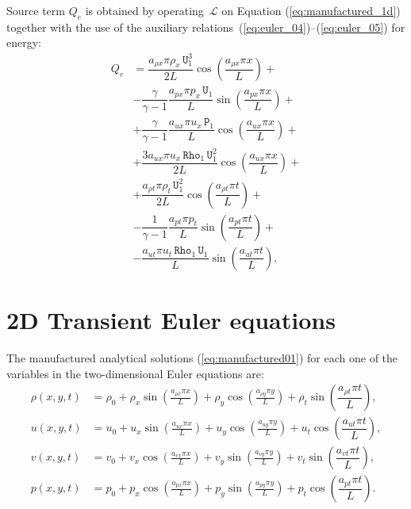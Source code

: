 \documentclass[10pt]{article}
\newcommand{\Rho}{\,\mathtt{Rho}}
\newcommand{\PP}{\,\mathtt{P}}
\newcommand{\U}{\,\mathtt{U}}
\newcommand{\Lo}{\,\mathcal{L}}
\begin{document}
Source term $Q_e$ is obtained by operating $\Lo$ on Equation  (\ref{eq:manufactured_1d}) together with the use of the  auxiliary relations~(\ref{eq:euler_04})--(\ref{eq:euler_05}) for energy:
  \begin{equation}\label{eq:source_e}
 \begin{split}
Q_e &= \dfrac{a_{\rho x} \pi \rho_x \U_1^3 }{2L}\cos\left(\dfrac{a_{\rho x} \pi x}{L}\right)+\\
&- \dfrac{\gamma}{\gamma-1}\dfrac{a_{px} \pi p_x \U_1}{L}\sin\left(\dfrac{a_{px} \pi x}{L}\right) +\\
&+ \dfrac{\gamma}{\gamma-1}\dfrac{a_{ux} \pi u_x \PP_1}{L}\cos\left(\dfrac{a_{ux} \pi x}{L}\right)  +\\
&+ \dfrac{ 3 a_{ux} \pi u_x \Rho_1 \U_1^2 }{2L}\cos\left(\dfrac{a_{ux} \pi x}{L}\right)+\\
&+   \dfrac{a_{\rho t} \pi \rho_t \U_1^2}{2L}\cos\left(\dfrac{a_{\rho t} \pi t}{L}\right)+\\
&- \dfrac{1}{\gamma-1}\dfrac{a_{pt} \pi p_t}{L}\sin\left(\dfrac{a_{pt} \pi t}{L}\right)+\\
&-\dfrac{ a_{ut} \pi u_t \Rho_1 \U_1}{L}\sin\left(\dfrac{a_{ut} \pi t}{L}\right).
 \end{split}
\end{equation}

 \section{2D Transient Euler equations}
The manufactured analytical solutions (\ref{eq:manufactured01}) for each one of the variables in the two-dimensional Euler equations are:
\begin{equation}
\begin{split}
\label{eq:manufactured_2d}
\rho\left(x,y,t\right) &=  \rho_{0}+ \rho_{x} \sin\left(\frac{a_{ \rho x} \pi x}{L}\right)+ \rho_{y} \cos\left(\frac{a_{ \rho y} \pi y}{L}\right)+ \rho_t \sin\left(\dfrac{a_{\rho t} \pi t}{L}\right),\\
u\left(x,y,t\right) &= u_{0}+u_{x} \sin\left(\frac{a_{u x} \pi x}{L}\right)+u_{y} \cos\left(\frac{a_{u y} \pi y}{L}\right) + u_t \cos\left(\dfrac{a_{u t} \pi t}{L}\right),\\
v\left(x,y,t\right) &= v_{0}+v_{x} \cos\left(\frac{a_{v x} \pi x}{L}\right)+v_{y} \sin\left(\frac{a_{v y} \pi y}{L}\right)+ v_t \sin\left(\dfrac{a_{v t} \pi t}{L}\right),\\
p\left(x,y,t\right) &= p_{0}+p_{x} \cos\left(\frac{a_{p x} \pi x}{L}\right)+p_{y} \sin\left(\frac{a_{p y} \pi y}{L}\right)+ p_t \cos\left(\dfrac{a_{p t} \pi t}{L}\right).\\
\end{split}
\end{equation}
\end{document}
